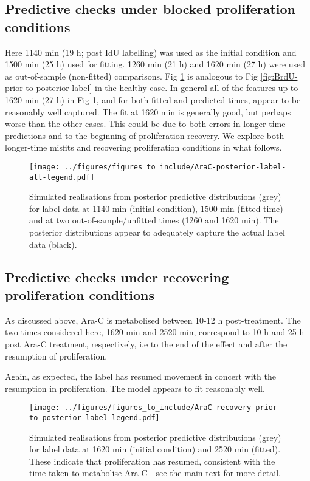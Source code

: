 \documentclass[10pt,letterpaper]{article}
\begin{document}
\subsection{Predictive checks under blocked proliferation
conditions}\label{predictive-checks-under-blocked-proliferation-conditions}

Here 1140 min (19 h; post IdU labelling) was used as the initial
condition and 1500 min (25 h) used for fitting. 1260 min (21 h) and 1620
min (27 h) were used as out-of-sample (non-fitted) comparisons. Fig
\ref{fig:AraC-posterior-label-all} is analogous to Fig
\ref{fig:BrdU-prior-to-posterior-label} in the healthy case. In general
all of the features up to 1620 min (27 h) in Fig
\ref{fig:AraC-posterior-label-all}, and for both fitted and predicted
times, appear to be reasonably well captured. The fit at 1620 min is
generally good, but perhaps worse than the other cases. This could be
due to both errors in longer-time predictions and to the beginning of
proliferation recovery. We explore both longer-time misfits and
recovering proliferation conditions in what follows.

\begin{figure}
\centering
\texttt{[image: ../figures/figures\_to\_include/AraC-posterior-label-all-legend.pdf]}
\caption{Simulated realisations from posterior predictive distributions
(grey) for label data at 1140 min (initial condition), 1500 min (fitted
time) and at two out-of-sample/unfitted times (1260 and 1620 min). The
posterior distributions appear to adequately capture the actual label
data (black).\label{fig:AraC-posterior-label-all}}
\end{figure}

\subsection{Predictive checks under recovering proliferation
conditions}\label{predictive-checks-under-recovering-proliferation-conditions}

As discussed above, Ara-C is metabolised between 10-12 h post-treatment.
The two times considered here, 1620 min and 2520 min, correspond to 10 h
and 25 h post Ara-C treatment, respectively, i.e to the end of the
effect and after the resumption of proliferation.

Again, as expected, the label has resumed movement in concert with the
resumption in proliferation. The model appears to fit reasonably well.

\begin{figure}
\centering
\texttt{[image: ../figures/figures\_to\_include/AraC-recovery-prior-to-posterior-label-legend.pdf]}
\caption{Simulated realisations from posterior predictive distributions
(grey) for label data at 1620 min (initial condition) and 2520 min
(fitted). These indicate that proliferation has resumed, consistent with
the time taken to metabolise Ara-C - see the main text for more
detail.\label{fig:AraC-recovery-posterior-label-all}}
\end{figure}
\end{document}
